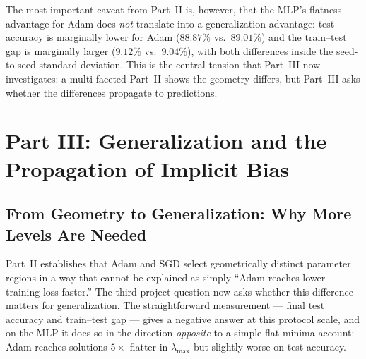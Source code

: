 \documentclass[11pt]{article}
\begin{document}
The most important caveat from Part~II is, however, that the MLP's flatness advantage for Adam does \emph{not} translate into a generalization advantage: test accuracy is marginally lower for Adam ($88.87\%$ vs.\ $89.01\%$) and the train--test gap is marginally larger ($9.12\%$ vs.\ $9.04\%$), with both differences inside the seed-to-seed standard deviation. This is the central tension that Part~III now investigates: a multi-faceted Part~II shows the geometry differs, but Part~III asks whether the differences propagate to predictions.

\FloatBarrier

\section{Part III: Generalization and the Propagation of Implicit Bias}
\label{sec:part3}

\subsection{From Geometry to Generalization: Why More Levels Are Needed}

Part~II establishes that Adam and SGD select geometrically distinct parameter regions in a way that cannot be explained as simply ``Adam reaches lower training loss faster.'' The third project question now asks whether this difference matters for generalization. The straightforward measurement --- final test accuracy and train--test gap --- gives a negative answer at this protocol scale, and on the MLP it does so in the direction \emph{opposite} to a simple flat-minima account: Adam reaches solutions $5\times$ flatter in $\lambda_{\max}$ but slightly worse on test accuracy.
\end{document}
